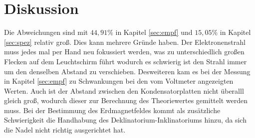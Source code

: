 \section{Diskussion}

Die Abweichungen sind mit $44,91 \%$ in Kapitel \ref{sec:empf} und $15,05 \%$ in Kapitel \ref{sec:spez} relativ groß.
Dies kann mehrere Gründe haben. Der Elektronenstrahl muss jedes mal per Hand neu fokussiert werden, was zu unterschiedlich
großen Flecken auf dem Leuchtschirm führt wodurch es schwierig ist den Strahl immer um den denselben Abstand zu verschieben.
Desweiteren kam es bei der Messung in Kapitel \ref{sec:empf} zu Schwankungen bei den vom Voltmeter angezeigten Werten.
Auch ist der Abstand zwischen den Kondensatorplatten nicht überalll gleich groß, wodurch dieser zur Berechnung des Theoriewertes
gemittelt werden muss.
Bei der Bestimmung des Erdmagnetfeldes kommt als zusätzliche Schwierigkeit die Handhabung des Deklinatorium-Inklinatoriums hinzu, da
sich die Nadel nicht richtig ausgerichtet hat.

